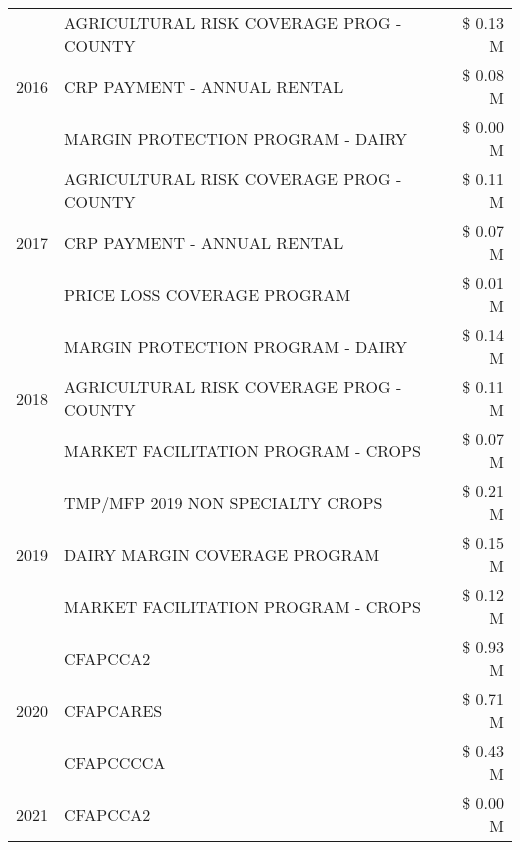 \begin{tabular}{llr}
\cline{1-3}
\multirow[t]{3}{*}{2016} & AGRICULTURAL RISK COVERAGE PROG - COUNTY & \$ 0.13 M \\
 & CRP PAYMENT - ANNUAL RENTAL & \$ 0.08 M \\
 & MARGIN PROTECTION PROGRAM - DAIRY & \$ 0.00 M \\
\cline{1-3}
\multirow[t]{3}{*}{2017} & AGRICULTURAL RISK COVERAGE PROG - COUNTY & \$ 0.11 M \\
 & CRP PAYMENT - ANNUAL RENTAL & \$ 0.07 M \\
 & PRICE LOSS COVERAGE PROGRAM & \$ 0.01 M \\
\cline{1-3}
\multirow[t]{3}{*}{2018} & MARGIN PROTECTION PROGRAM - DAIRY & \$ 0.14 M \\
 & AGRICULTURAL RISK COVERAGE PROG - COUNTY & \$ 0.11 M \\
 & MARKET FACILITATION PROGRAM - CROPS & \$ 0.07 M \\
\cline{1-3}
\multirow[t]{3}{*}{2019} & TMP/MFP 2019 NON SPECIALTY CROPS & \$ 0.21 M \\
 & DAIRY MARGIN COVERAGE PROGRAM & \$ 0.15 M \\
 & MARKET FACILITATION PROGRAM - CROPS & \$ 0.12 M \\
\cline{1-3}
\multirow[t]{3}{*}{2020} & CFAPCCA2 & \$ 0.93 M \\
 & CFAPCARES & \$ 0.71 M \\
 & CFAPCCCCA & \$ 0.43 M \\
\cline{1-3}
2021 & CFAPCCA2 & \$ 0.00 M \\
\cline{1-3}
\bottomrule
\end{tabular}
